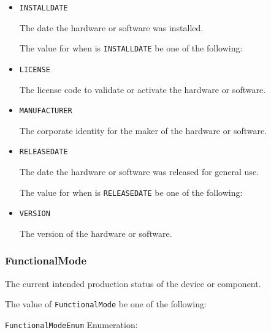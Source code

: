 \begin{itemize}

\item \texttt{INSTALL\textunderscore DATE}


The date the hardware or software was installed.


The value for  when  is \texttt{INSTALL\textunderscore DATE} \MUST be one of the following: 

\item \texttt{LICENSE}


The license code to validate or activate the hardware or software.

\item \texttt{MANUFACTURER}


The corporate identity for the maker of the hardware or software.


\item \texttt{RELEASE\textunderscore DATE}


The date the hardware or software was released for general use.



The value for  when  is \texttt{RELEASE\textunderscore DATE} \MUST be one of the following: 

\item \texttt{VERSION}


The version of the hardware or software.


\end{itemize}








\subsubsection{FunctionalMode}
\label{sec:FunctionalMode}



The current intended production status of the device or component.


The value of \texttt{FunctionalMode} \MUST be one of the following: 


\texttt{FunctionalModeEnum} Enumeration:

